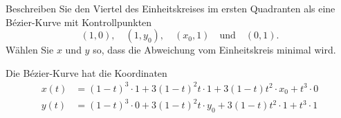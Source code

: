 Beschreiben Sie den Viertel des Einheitskreises im ersten Quadranten
als eine Bézier-Kurve mit Kontrollpunkten 
\[
(1,0),\quad (1,y_0), \quad (x_0,1) \quad\text{und}\quad (0,1).
\]
Wählen Sie $x$ und $y$ so, dass die Abweichung vom Einheitskreis
minimal wird.

\begin{loesung}
Die Bézier-Kurve hat die Koordinaten
\begin{align*}
x(t)
&=
(1-t)^3\cdot1
+
3(1-t)^2t\cdot1
+
3(1-t)t^2\cdot x_0
+
t^3\cdot 0
\\
y(t)
&=
(1-t)^3\cdot0
+
3(1-t)^2t\cdot y_0
+
3(1-t)t^2\cdot 1
+
t^3\cdot 1
\end{align*}
\end{loesung}
